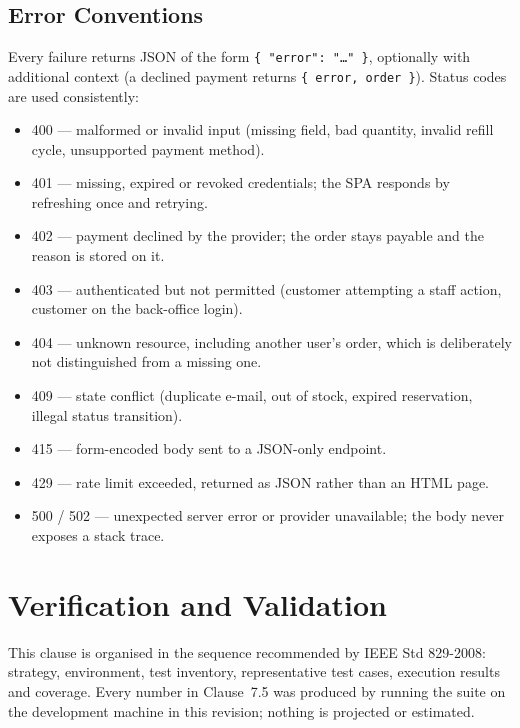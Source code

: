 \documentclass[11pt,a4paper]{article}
\begin{document}
\subsection{Error Conventions}
Every failure returns JSON of the form \texttt{\{ "error": "\ldots" \}}, optionally with
additional context (a declined payment returns \texttt{\{ error, order \}}). Status
codes are used consistently:
\begin{itemize}[leftmargin=1.2em,itemsep=1pt,topsep=2pt]
  \item 400 --- malformed or invalid input (missing field, bad quantity, invalid refill cycle, unsupported payment method).
  \item 401 --- missing, expired or revoked credentials; the SPA responds by refreshing once and retrying.
  \item 402 --- payment declined by the provider; the order stays payable and the reason is stored on it.
  \item 403 --- authenticated but not permitted (customer attempting a staff action, customer on the back-office login).
  \item 404 --- unknown resource, including another user's order, which is deliberately not distinguished from a missing one.
  \item 409 --- state conflict (duplicate e-mail, out of stock, expired reservation, illegal status transition).
  \item 415 --- form-encoded body sent to a JSON-only endpoint.
  \item 429 --- rate limit exceeded, returned as JSON rather than an HTML page.
  \item 500 / 502 --- unexpected server error or provider unavailable; the body never exposes a stack trace.
\end{itemize}

\section{Verification and Validation}
This clause is organised in the sequence recommended by IEEE Std 829-2008: strategy,
environment, test inventory, representative test cases, execution results and coverage.
Every number in Clause~7.5 was produced by running the suite on the development machine
in this revision; nothing is projected or estimated.
\end{document}
